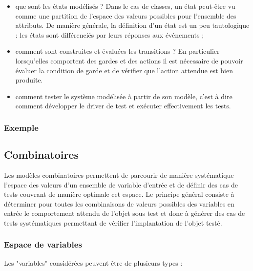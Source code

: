 \begin{itemize}
       
\item que sont les \'etats mod\'elis\'es ? Dans le cas de classes, un
      \'etat peut-\^etre vu comme une partition de l'espace des valeurs
      possibles  pour l'ensemble des attributs. De mani\`ere g\'en\'erale,
      la d\'efinition d'un \'etat est un peu tautologique : les \'etats sont
      diff\'erenci\'es par leurs r\'eponses aux \'ev\'enements ; 
\item comment sont construites et \'evalu\'ees les transitions ? En
      particulier lorsqu'elles comportent des gardes et des actions il
      est n\'ecessaire  de pouvoir \'evaluer la condition de garde et de
      v\'erifier que l'action attendue est  bien produite. 
\item comment tester le syst\`eme mod\'elis\'ee \`a partir de son
      mod\`ele, c'est \`a dire comment d\'evelopper le driver de test et
       ex\'ecuter effectivement les tests.
\end{itemize}
  
\par
  
\subsubsection{Exemple}
  
\subsection{Combinatoires}
  
    Les mod\`eles combinatoires permettent de parcourir de mani\`ere
    syst\'ematique l'espace des valeurs d'un ensemble de variable
    d'entr\'ee et de d\'efinir des cas de tests couvrant de mani\`ere
    optimale cet espace. Le principe g\'en\'eral consiste \`a d\'eterminer
    pour toutes les combinaisons de valeurs possibles des variables en
    entr\'ee le comportement attendu de l'objet sous test et donc \`a
    g\'en\'erer des cas de tests syst\'ematiques permettant de v\'erifier
    l'implantation de l'objet test\'e. 
    
\par
  
\subsubsection{Espace de variables}
  
    Les "variables" consid\'er\'ees peuvent \^etre de plusieurs types :
     
